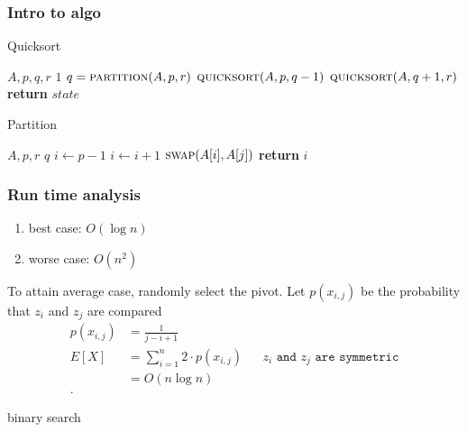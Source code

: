 \documentclass[../../main/main.tex]{subfiles}
\begin{document}
\subsubsection{Intro to algo}
\begin{algorithm}[H]
  \algrenewcommand{}
  \algrenewcommand{}
  \caption{Quicksort}\label{alg:}
  \begin{algorithmic}[1]
    \Require $A,p,q,r$
    \Ensure $1$
    \EndIf
    \State $q = \Call{partition}{A,p,r}$
    \State $\Call{quicksort}{A,p,q-1}$
    \State $\Call{quicksort}{A,q+1, r}$
    \State \textbf{return} $state$
  \end{algorithmic}
\end{algorithm}
\begin{algorithm}[H]
  \algrenewcommand{}
  \algrenewcommand{}
  \caption{Partition}\label{alg:}
  \begin{algorithmic}[1]
    \Require $A,p,r$
    \Ensure $q$
    \State $i \gets p-1$
    \State $i \gets i+1$
    \State $\Call{swap}{A[i], A[j]}$
    \EndIf
    \EndFor
    \State \textbf{return} $i$
  \end{algorithmic}
\end{algorithm}

\subsubsection{Run time analysis}
\begin{enumerate}
  \item best case: $O(\log n)$
  \item worse case: $O(n^2)$
\end{enumerate}

To attain average case, randomly select the pivot. Let $p(x_{i,j})$ be the probability that $z_i$ and $z_j$ are compared
\begin{align*}
  p(x_{i,j}) &= \frac{1}{j-i+1} \\
  E[X]&= \sum^{n}_{i=1} 2\cdot p(x_{i,j}) && \texttt{$z_{i}$ and $z_j$ are symmetric}\\ 
  &= O(n \log n) \\
.\end{align*}
\begin{exercise}

  binary search
\end{exercise}
\end{document}
